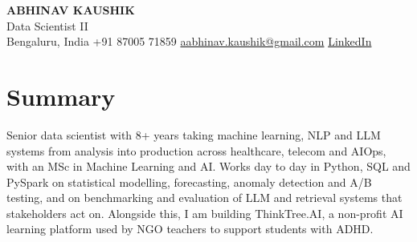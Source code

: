 \documentclass[10pt,a4paper]{article}
\begin{document}
\begin{center}
  {\LARGE\bfseries ABHINAV KAUSHIK}\\[2pt]
  {\large Data Scientist II}\\[2pt]
  Bengaluru, India \textbar{} +91 87005 71859 \textbar{} \href{mailto:aabhinav.kaushik@gmail.com}{aabhinav.kaushik@gmail.com} \textbar{} \href{https://www.linkedin.com/in/abhinav-kaushik10/}{LinkedIn}  
\end{center}

\section{Summary}
Senior data scientist with 8+ years taking machine learning, NLP and LLM systems from analysis into production across healthcare, telecom and AIOps, with an MSc in Machine Learning and AI. Works day to day in Python, SQL and PySpark on statistical modelling, forecasting, anomaly detection and A/B testing, and on benchmarking and evaluation of LLM and retrieval systems that stakeholders act on. Alongside this, I am building ThinkTree.AI, a non-profit AI learning platform used by NGO teachers to support students with ADHD.
\end{document}
